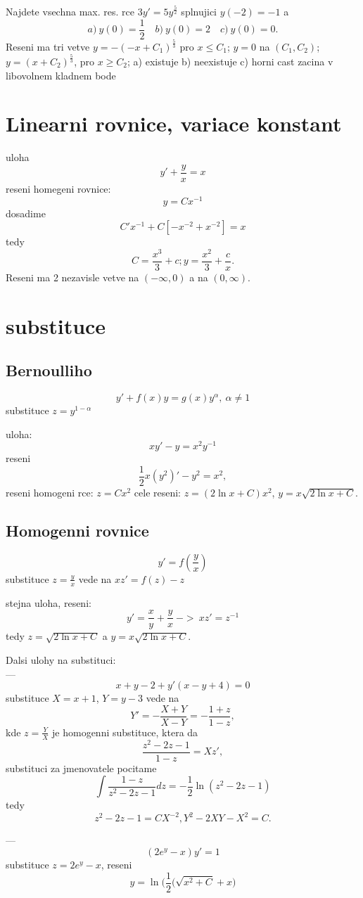 Najdete vsechna max. res. rce $3y'=5y^\frac{5}{2}$ splnujici $y(-2)=-1$ a
\[
  a)\ y(0)=\frac12\quad 
  b)\ y(0)=2\quad
  c)\ y(0)=0.
\]
Reseni ma tri vetve $y=-(-x+C_1)^{\frac53}$ pro $x\le C_1$;
$y=0$ na $(C_1,C_2)$;
$y=(x+C_2)^{\frac53}$, pro $x\ge C_2$;
a) existuje b) neexistuje c) horni cast zacina v libovolnem kladnem bode

\section{Linearni rovnice, variace konstant}
uloha
\[
  y'+\frac{y}{x}=x
\]
reseni homegeni rovnice:
\[
  y=C x^{-1}
\]
dosadime
\[
  C' x^{-1} + C [- x^{-2} + x^{-2}]=x  
\]
tedy
\[
  C=\frac{x^3}{3}+c; y=\frac{x^2}{3}+\frac{c}{x}.
\]
Reseni ma 2 nezavisle vetve na $(-\infty,0)$ a na $(0,\infty)$.

\section{substituce}
\subsection{Bernoulliho}
\[
  y'+f(x)y=g(x)y^\alpha,\ \alpha\ne 1
\]
substituce $z=y^{1-\alpha}$

uloha:
\[
  xy'-y=x^2y^{-1}
\]
reseni
\[
  \frac12 x (y^2)' - y^2 = x^2, 
\]
reseni homogeni rce: $z=Cx^2$
cele reseni: $z=(2\ln x+C)x^2$, $y=x\sqrt{2\ln x +C}$.

\subsection{Homogenni rovnice}
\[
  y'=f(\frac{y}{x})
\]
substituce $z=\frac{y}{x}$ vede na $xz'=f(z)-z$

stejna uloha, reseni:
\[
  y'=\frac{x}{y}+\frac{y}{x}\ ->\ xz'=z^{-1}
\]
tedy $z=\sqrt{2\ln x+C}$ a $y=x\sqrt{2\ln x +C}$.

Dalsi ulohy na substituci:\\
---
\[
  x+y-2+y'(x-y+4)=0  
\]
substituce $X=x+1$, $Y=y-3$ vede na
\[
  Y'=-\frac{X+Y}{X-Y}=-\frac{1+z}{1-z},
\]
kde $z=\frac{Y}{X}$  je homogenni substituce, ktera da
\[
  \frac{z^2-2z-1}{1-z}=Xz',
\]
substituci za jmenovatele pocitame
\[
  \int \frac{1-z}{z^2-2z-1} dz=-\frac12\ln(z^2-2z-1)
\]
tedy
\[
  z^2-2z-1=CX^{-2}, Y^2-2XY-X^2=C.
\]

---
\[
  (2e^y-x)y'=1
\]
substituce $z=2e^y-x$, reseni 
\[
y=\ln\big(\frac12(\sqrt{x^2+C}+x\big)
\]


